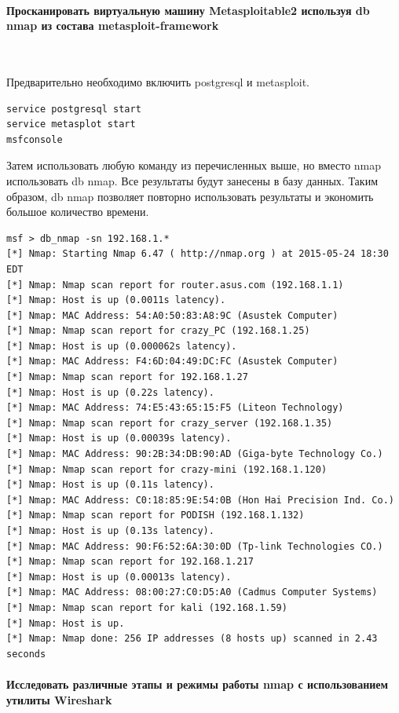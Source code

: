 \documentclass{article}
\begin{document}
\paragraph{Просканировать виртуальную машину Metasploitable2 используя db nmap из состава metasploit-framework}
~

Предварительно необходимо включить postgresql и metasploit.

\begin{verbatim}
service postgresql start
service metasplot start
msfconsole
\end{verbatim}

Затем использовать любую команду из перечисленных выше, но вместо nmap использовать db nmap. Все результаты будут занесены в базу данных. Таким образом, db nmap позволяет повторно использовать результаты и экономить большое количество времени.

\begin{verbatim}
msf > db_nmap -sn 192.168.1.*
[*] Nmap: Starting Nmap 6.47 ( http://nmap.org ) at 2015-05-24 18:30 EDT
[*] Nmap: Nmap scan report for router.asus.com (192.168.1.1)
[*] Nmap: Host is up (0.0011s latency).
[*] Nmap: MAC Address: 54:A0:50:83:A8:9C (Asustek Computer)
[*] Nmap: Nmap scan report for crazy_PC (192.168.1.25)
[*] Nmap: Host is up (0.000062s latency).
[*] Nmap: MAC Address: F4:6D:04:49:DC:FC (Asustek Computer)
[*] Nmap: Nmap scan report for 192.168.1.27
[*] Nmap: Host is up (0.22s latency).
[*] Nmap: MAC Address: 74:E5:43:65:15:F5 (Liteon Technology)
[*] Nmap: Nmap scan report for crazy_server (192.168.1.35)
[*] Nmap: Host is up (0.00039s latency).
[*] Nmap: MAC Address: 90:2B:34:DB:90:AD (Giga-byte Technology Co.)
[*] Nmap: Nmap scan report for crazy-mini (192.168.1.120)
[*] Nmap: Host is up (0.11s latency).
[*] Nmap: MAC Address: C0:18:85:9E:54:0B (Hon Hai Precision Ind. Co.)
[*] Nmap: Nmap scan report for PODISH (192.168.1.132)
[*] Nmap: Host is up (0.13s latency).
[*] Nmap: MAC Address: 90:F6:52:6A:30:0D (Tp-link Technologies CO.)
[*] Nmap: Nmap scan report for 192.168.1.217
[*] Nmap: Host is up (0.00013s latency).
[*] Nmap: MAC Address: 08:00:27:C0:D5:A0 (Cadmus Computer Systems)
[*] Nmap: Nmap scan report for kali (192.168.1.59)
[*] Nmap: Host is up.
[*] Nmap: Nmap done: 256 IP addresses (8 hosts up) scanned in 2.43 seconds
\end{verbatim}

\paragraph{Исследовать различные этапы и режимы работы nmap с использованием утилиты Wireshark}
~
\end{document}
